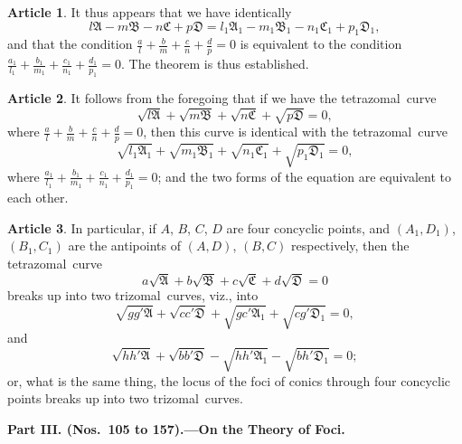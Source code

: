 \documentclass[11pt,a4paper]{article}
\theoremstyle{definition}
\newtheorem{art}{Article}
\newcommand{\trizomal}{trizomal}
\newcommand{\tetrazomal}{tetrazomal}
\begin{document}
\begin{art}
It thus appears that we have identically
\[
l\mathfrak{A} - m\mathfrak{B} - n\mathfrak{C} + p\mathfrak{D} = l_{1}\mathfrak{A}_{1} - m_{1}\mathfrak{B}_{1} - n_{1}\mathfrak{C}_{1} + p_{1}\mathfrak{D}_{1},
\]
and that the condition $\tfrac{a}{l} + \tfrac{b}{m} + \tfrac{c}{n} + \tfrac{d}{p} = 0$ is equivalent to the condition $\tfrac{a_{1}}{l_{1}} + \tfrac{b_{1}}{m_{1}} + \tfrac{c_{1}}{n_{1}} + \tfrac{d_{1}}{p_{1}} = 0$. The theorem is thus established.
\end{art}

\begin{art}
It follows from the foregoing that if we have the \tetrazomal\ curve
\[
\sqrt{l\mathfrak{A}} + \sqrt{m\mathfrak{B}} + \sqrt{n\mathfrak{C}} + \sqrt{p\mathfrak{D}} = 0,
\]
where $\tfrac{a}{l} + \tfrac{b}{m} + \tfrac{c}{n} + \tfrac{d}{p} = 0$, then this curve is identical with the \tetrazomal\ curve
\[
\sqrt{l_{1}\mathfrak{A}_{1}} + \sqrt{m_{1}\mathfrak{B}_{1}} + \sqrt{n_{1}\mathfrak{C}_{1}} + \sqrt{p_{1}\mathfrak{D}_{1}} = 0,
\]
where $\tfrac{a_{1}}{l_{1}} + \tfrac{b_{1}}{m_{1}} + \tfrac{c_{1}}{n_{1}} + \tfrac{d_{1}}{p_{1}} = 0$; and the two forms of the equation are equivalent to each other.
\end{art}

\begin{art}
In particular, if $A$, $B$, $C$, $D$ are four concyclic points, and $(A_{1}, D_{1})$, $(B_{1}, C_{1})$ are the antipoints of $(A, D)$, $(B, C)$ respectively, then the \tetrazomal\ curve
\[
a\sqrt{\mathfrak{A}} + b\sqrt{\mathfrak{B}} + c\sqrt{\mathfrak{C}} + d\sqrt{\mathfrak{D}} = 0
\]
breaks up into two \trizomal\ curves, viz., into
\[
\sqrt{gg'\mathfrak{A}} + \sqrt{cc'\mathfrak{D}} + \sqrt{gc'\mathfrak{A}_{1}} + \sqrt{cg'\mathfrak{D}_{1}} = 0,
\]
and
\[
\sqrt{hh'\mathfrak{A}} + \sqrt{bb'\mathfrak{D}} - \sqrt{hh'\mathfrak{A}_{1}} - \sqrt{bh'\mathfrak{D}_{1}} = 0;
\]
or, what is the same thing, the locus of the foci of conics through four concyclic points breaks up into two \trizomal\ curves.
\end{art}

\newpage
\begin{center}
\textbf{Part III. (Nos.\ 105 to 157).---On the Theory of Foci.}
\end{center}

\vspace{0.5em}
\end{document}
